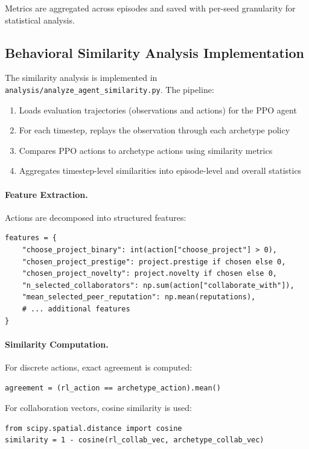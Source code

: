 \documentclass[english,bachelor]{hsluthesis}
\begin{document}
Metrics are aggregated across episodes and saved with per-seed granularity for statistical analysis.

\subsection{Behavioral Similarity Analysis Implementation}

The similarity analysis is implemented in \texttt{analysis/analyze\_agent\_similarity.py}. The pipeline:

\begin{enumerate}
    \item Loads evaluation trajectories (observations and actions) for the PPO agent
    \item For each timestep, replays the observation through each archetype policy
    \item Compares PPO actions to archetype actions using similarity metrics
    \item Aggregates timestep-level similarities into episode-level and overall statistics
\end{enumerate}

\paragraph{Feature Extraction.}
Actions are decomposed into structured features:

\begin{verbatim}
features = {
    "choose_project_binary": int(action["choose_project"] > 0),
    "chosen_project_prestige": project.prestige if chosen else 0,
    "chosen_project_novelty": project.novelty if chosen else 0,
    "n_selected_collaborators": np.sum(action["collaborate_with"]),
    "mean_selected_peer_reputation": np.mean(reputations),
    # ... additional features
}
\end{verbatim}

\paragraph{Similarity Computation.}
For discrete actions, exact agreement is computed:

\begin{verbatim}
agreement = (rl_action == archetype_action).mean()
\end{verbatim}

For collaboration vectors, cosine similarity is used:

\begin{verbatim}
from scipy.spatial.distance import cosine
similarity = 1 - cosine(rl_collab_vec, archetype_collab_vec)
\end{verbatim}
\end{document}
